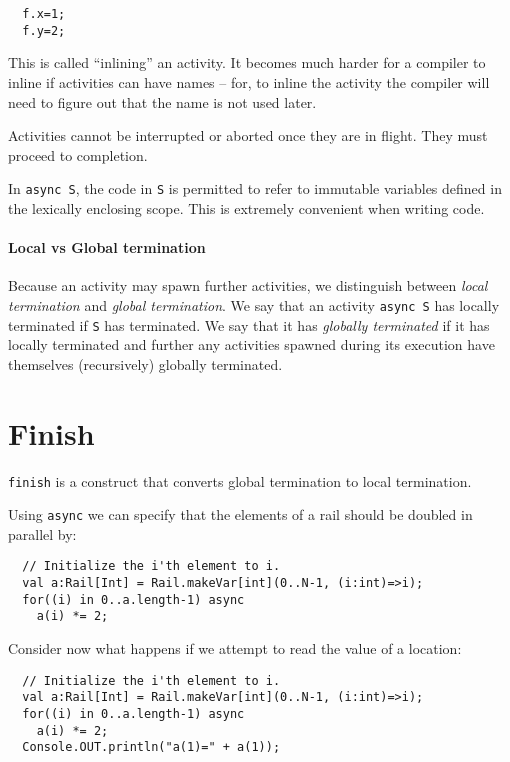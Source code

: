 {\footnotesize
\begin{verbatim}
  f.x=1;
  f.y=2;
\end{verbatim}}

\noindent This is called ``inlining'' an activity. It becomes much
harder for a compiler to inline if activities can have names -- for,
to inline the activity the compiler will need to figure out that the
name is not used later.  

Activities cannot be interrupted or aborted once they are in
flight. They must proceed to completion.  

In {\tt async S}, the code in {\tt S} is permitted to refer to
immutable variables defined in the lexically enclosing scope. This is
extremely convenient when writing code. 

\paragraph{Local vs Global termination}
Because an activity may spawn further activities, we distinguish
between {\em local termination} and {\em global termination}. We say
that an activity {\tt async S} has locally terminated if {\tt S} has
terminated. We say that it has {\em globally terminated} if it has
locally terminated and further any activities spawned during its
execution have themselves (recursively) globally terminated. 

\section{Finish}\label{sec:finish}
{\tt finish} is a construct that converts global termination to local termination.

Using {\tt async} we can specify that the elements of a rail should be doubled in parallel by:

{\footnotesize
\begin{verbatim}
  // Initialize the i'th element to i.
  val a:Rail[Int] = Rail.makeVar[int](0..N-1, (i:int)=>i);
  for((i) in 0..a.length-1) async
    a(i) *= 2;
\end{verbatim}}

Consider now what happens if we attempt to read the value of a location:

{\footnotesize
\begin{verbatim}
  // Initialize the i'th element to i.
  val a:Rail[Int] = Rail.makeVar[int](0..N-1, (i:int)=>i);
  for((i) in 0..a.length-1) async
    a(i) *= 2;
  Console.OUT.println("a(1)=" + a(1));
\end{verbatim}}

